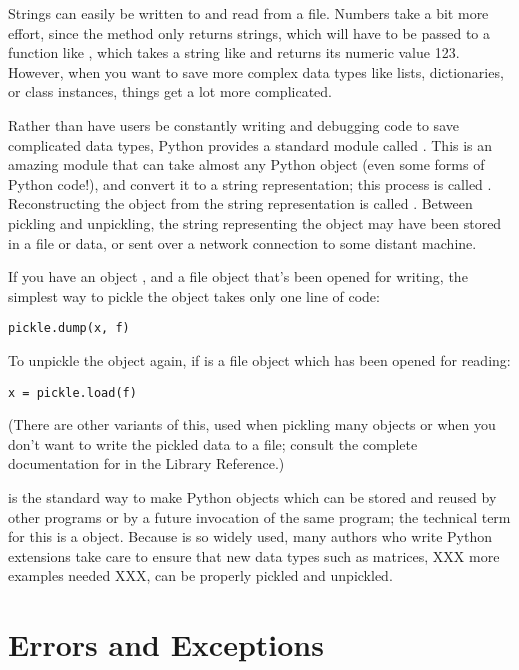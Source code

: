 \documentclass{manual}
\begin{document}
Strings can easily be written to and read from a file. Numbers take a
bit more effort, since the  method only returns
strings, which will have to be passed to a function like
, which takes a string like  and
returns its numeric value 123.  However, when you want to save more
complex data types like lists, dictionaries, or class instances,
things get a lot more complicated.

Rather than have users be constantly writing and debugging code to
save complicated data types, Python provides a standard module called
.  This is an amazing module that can take almost
any Python object (even some forms of Python code!), and convert it to
a string representation; this process is called .  
Reconstructing the object from the string representation is called
.  Between pickling and unpickling, the string
representing the object may have been stored in a file or data, or
sent over a network connection to some distant machine.

If you have an object , and a file object  that's been
opened for writing, the simplest way to pickle the object takes only
one line of code:

\begin{verbatim}
pickle.dump(x, f)
\end{verbatim}

To unpickle the object again, if  is a file object which has
been opened for reading:

\begin{verbatim}
x = pickle.load(f)
\end{verbatim}

(There are other variants of this, used when pickling many objects or
when you don't want to write the pickled data to a file; consult the
complete documentation for  in the Library Reference.)

 is the standard way to make Python objects which can be
stored and reused by other programs or by a future invocation of the
same program; the technical term for this is a 
object.  Because  is so widely used, many authors who
write Python extensions take care to ensure that new data types such
as matrices, XXX more examples needed XXX, can be properly pickled and
unpickled.



\chapter{Errors and Exceptions}
\label{errors}
\end{document}
